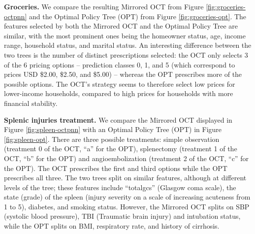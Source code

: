 \documentclass[10pt]{article} %
\begin{document}
\textbf{Groceries.} We compare the resulting Mirrored OCT from Figure \ref{fig:groceries-octpnn} and the Optimal Policy Tree (OPT) from Figure \ref{fig:groceries-opt}. 
The features selected by both the Mirrored OCT and the Optimal Policy Tree are similar, with the most prominent ones being the homeowner status, age, income range, household status, and marital status. An interesting difference between the two trees is the number of distinct prescriptions selected: the OCT only selects 3 of the 6 pricing options -- prediction classes 0, 1, and 5 (which correspond to prices USD \$2.00, \$2.50, and \$5.00) -- whereas the OPT prescribes more of the possible options. The OCT's strategy seems to therefore select low prices for lower-income households, compared to high prices for households with more financial stability. 
 
\textbf{Splenic injuries treatment.} We compare the Mirrored OCT displayed in Figure \ref{fig:spleen-octpnn} with an Optimal Policy Tree (OPT) in Figure \ref{fig:spleen-opt}. 
There are three possible treatments: simple observation (treatment 0 of the OCT, ``a'' for the OPT), splenectomy (treatment 1 of the OCT, ``b'' for the OPT) and angioembolization (treatment 2 of the OCT, ``c'' for the OPT). The OCT prescribes the first and third options while the OPT prescribes all three. The two trees split on similar features, although at different levels of the tree; these features include ``totalgcs'' (Glasgow coma scale), the state (grade) of the spleen (injury severity on a scale of increasing acuteness from 1 to 5), diabetes, and smoking status. However, the Mirrored OCT splits on SBP (systolic blood pressure),  TBI (Traumatic brain injury) and intubation status, while the OPT splits on BMI, respiratory rate, and history of cirrhosis.
\end{document}
